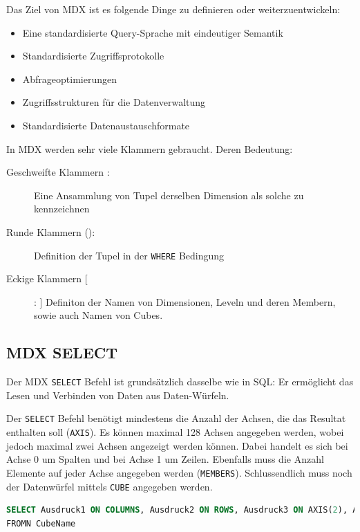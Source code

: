 \documentclass[a4paper, 11pt, nofootinbib]{article}
\newcommand{\code}[1]{\texttt{#1}}
\begin{document}
\vspace{10px}

\noindent Das Ziel von MDX ist es folgende Dinge zu definieren oder weiterzuentwickeln:
\begin{itemize}
	\item Eine standardisierte Query-Sprache mit eindeutiger Semantik
	\item Standardisierte Zugriffsprotokolle
	\item Abfrageoptimierungen
	\item Zugriffsstrukturen für die Datenverwaltung
	\item Standardisierte Datenaustauschformate
\end{itemize}

\vspace{10px}

In MDX werden sehr viele Klammern gebraucht. Deren Bedeutung:

\begin{description}
	\item[Geschweifte Klammern {}: ] Eine Ansammlung von Tupel derselben Dimension als solche zu kennzeichnen
	\item[Runde Klammern (): ] Definition der Tupel in der \code{WHERE} Bedingung
	\item[Eckige Klammern []: ] Definiton der Namen von Dimensionen, Leveln und deren Membern, sowie auch Namen von Cubes.
\end{description}

\subsection{MDX SELECT}
Der MDX \code{SELECT} Befehl ist grundsätzlich dasselbe wie in SQL: Er ermöglicht das Lesen und Verbinden von Daten aus Daten-Würfeln. 

\vspace{10px}

\noindent Der \code{SELECT} Befehl benötigt mindestens die Anzahl der Achsen, die das Resultat enthalten soll (\code{AXIS}). Es können maximal 128 Achsen angegeben werden, wobei jedoch maximal zwei Achsen angezeigt werden können. Dabei handelt es sich bei Achse 0 um Spalten und bei Achse 1 um Zeilen. Ebenfalls muss die Anzahl Elemente auf jeder Achse angegeben werden (\code{MEMBERS}). Schlussendlich muss noch der Datenwürfel mittels \code{CUBE} angegeben werden.
\begin{lstlisting}[language=sql, captionpos=b, caption={Allgemeiner Syntax von MDX' SELECT}]
SELECT Ausdruck1 ON COLUMNS, Ausdruck2 ON ROWS, Ausdruck3 ON AXIS(2), Ausdruck4 ON AXIS(3)
FROMN CubeName
\end{lstlisting}
\end{document}
